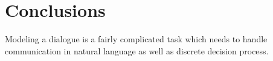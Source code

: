 \chapter{Conclusions}
\label{chap:conclusion}
Modeling a dialogue is a fairly complicated task which needs to handle communication in natural language as well as  discrete decision process.